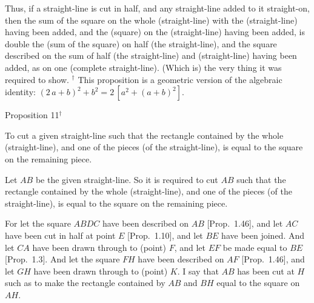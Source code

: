 Thus, if a straight-line is cut in half, and any straight-line added to it straight-on,
then the sum of the square on the whole (straight-line) with the (straight-line) having
been added, and the (square) on the (straight-line) having been added, 
is double the (sum of the square) on half (the straight-line), and
the square described on the sum of half (the straight-line) and (straight-line)
having been added, as on one (complete straight-line). (Which is) the
very thing it was required to show.
{\footnotesize \noindent$^\dag$ This proposition is a geometric version
of the algebraic identity: $(2\,a+b)^2+b^2= 2\,[a^2+(a+b)^2]$.}


\begin{center}
{\large Proposition 11$^\dag$}
\end{center}

To cut a given straight-line such that the rectangle contained by the whole (straight-line), and one of the pieces (of the straight-line), is equal to the
square on the remaining piece.

\epsfysize=2.75in
\centerline{}

Let $AB$ be the given straight-line. So it is required to cut $AB$ such that the rectangle contained by the whole (straight-line), and one of the
pieces (of the straight-line), is equal to the square on the remaining piece.

For let the square $ABDC$ have been described on $AB$ [Prop.~1.46],
and let $AC$ have been cut in half at point $E$ [Prop.~1.10], and
let $BE$ have been joined.  And let $CA$ have been drawn through to (point)
$F$, and let $EF$ be made equal to $BE$ [Prop.~1.3]. And let the square $FH$ have
been described on $AF$ [Prop.~1.46], and let $GH$ have been drawn
through to (point) $K$. I say that $AB$ has been cut at $H$ such as to make the
rectangle contained by $AB$ and $BH$ equal to the square on $AH$.

